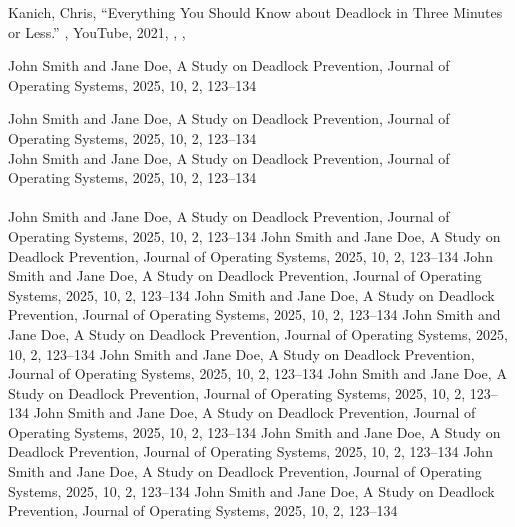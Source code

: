 \documentclass{article}
\begin{document}
{
  {Kanich, Chris},
  {“Everything You Should Know about Deadlock in Three Minutes or Less.” },
  {YouTube},
 {2021},
{},
  {},
  {}}
  {\vspace{.5cm}
{John Smith and Jane Doe},
{A Study on Deadlock Prevention},
{Journal of Operating Systems},
{2025},
{10},
{2},
{123--134\\}

}{
{John Smith and Jane Doe},
{A Study on Deadlock Prevention},
{Journal of Operating Systems},
{2025},
{10},
{2},
{123--134}
}{
{\\John Smith and Jane Doe},
{A Study on Deadlock Prevention},
{Journal of Operating Systems},
{2025},
{10},
{2},
{123--134\\}
}{
{\\John Smith and Jane Doe},
{A Study on Deadlock Prevention},
{Journal of Operating Systems},
{2025},
{10},
{2},
{123--134}
}{
{John Smith and Jane Doe},
{A Study on Deadlock Prevention},
{Journal of Operating Systems},
{2025},
{10},
{2},
{123--134}
}{
{John Smith and Jane Doe},
{A Study on Deadlock Prevention},
{Journal of Operating Systems},
{2025},
{10},
{2},\vspace{.5 cm}
{123--134}
}{
{John Smith and Jane Doe},
{A Study on Deadlock Prevention},
{Journal of Operating Systems},
{2025},
{10},
{2},
{123--134}
}{
{John Smith and Jane Doe},
{A Study on Deadlock Prevention},
{Journal of Operating Systems},
{2025},
{10},
{2},
{123--134}
}{
{John Smith and Jane Doe},
{A Study on Deadlock Prevention},
{Journal of Operating Systems},
{2025},
{10},
{2},
{123--134}
}{
{John Smith and Jane Doe},
{A Study on Deadlock Prevention},
{Journal of Operating Systems},
{2025},
{10},
{2},
{123--134}
}{
{John Smith and Jane Doe},
{A Study on Deadlock Prevention},
{Journal of Operating Systems},
{2025},
{10},
{2},
{123--134}
}{
{John Smith and Jane Doe},
{A Study on Deadlock Prevention},
{Journal of Operating Systems},
{2025},
{10},
{2},
{123--134}
}{
{John Smith and Jane Doe},
{A Study on Deadlock Prevention},
{Journal of Operating Systems},
{2025},
{10},
{2},
{123--134}
}{
{John Smith and Jane Doe},
{A Study on Deadlock Prevention},
{Journal of Operating Systems},
{2025},
{10},
{2},
{123--134}
}
\end{document}
